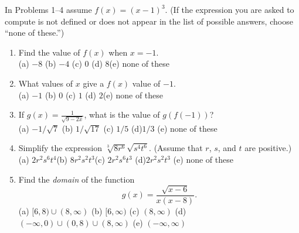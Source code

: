 \documentclass[fleqn,12pt]{article}
\newcommand{\<}{\ensuremath{\langle}}
\renewcommand{\>}{\ensuremath{\rangle}}
\begin{document}
\newcommand\probskip{\vskip2cm}

\bigskip

In Problems 1--4 assume $f(x) = (x-1)^3$.
(If the expression you are asked to compute is not defined or does not appear in
the list of possible answers, choose ``none of these.'')
\begin{enumerate}[label={\bf \arabic*.}]
\item Find the value of $f(x)$ when $x = -1$. 
  \\[6pt]
  (a) $-8$ \hfill (b) $-4$ \hfill (c) $0$ \hfill (d) $8$\hfill (e) none of these

  \probskip

\item What values of $x$ give a $f(x)$ value of $-1$.
  \\[6pt]
  (a) $-1$ \hfill (b) $0$ \hfill (c) $1$ \hfill (d) $2$\hfill (e) none of these

  \probskip

\item If $g(x) = \frac{1}{\sqrt{9-2x}}$, what is the value of $g(f(-1))$? 
  \\[6pt]
  (a) $-1/\sqrt{7}$ \hfill (b)  $1/\sqrt{17}$ \hfill (c)  $1/5$ \hfill (d)$1/3$ \hfill (e) none of these

  \probskip

\item
  Simplify the expression $\sqrt[3]{8r^6}\sqrt{s^4t^6}$. (Assume that $r$, $s$, and $t$ are positive.)\\[6pt]
  (a) $2r^2s^6t^4$\hfill (b) $8r^2s^2t^3$\hfill (c) $2r^2s^6t^3$ \hfill (d)$2r^2s^2t^3$
  \hfill (e) none of these %

  \probskip

\item Find the \emph{domain} of the function
  \[g(x) = \frac{\sqrt{x-6}}{x(x-8)}.\]
  (a) $[6, 8) \cup (8, \infty)$\hfill
    (b) $[6, \infty)$\hfill
      (c) $(8, \infty)$\hfill
      (d) $(-\infty, 0) \cup (0, 8) \cup (8, \infty)$\hfill
      (e) $(-\infty, \infty)$




\end{enumerate}
\end{document}
